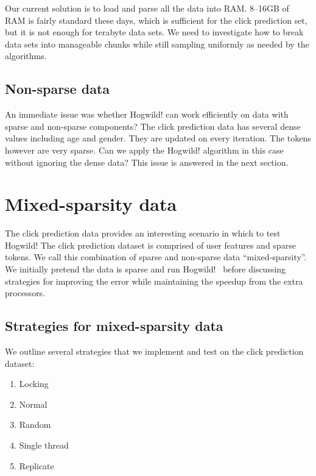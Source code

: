 \documentclass{article} %
\begin{document}
Our current solution is to load and parse all the data into RAM. 8--16GB of RAM is fairly standard these days, which is sufficient for the click prediction set, but it is not enough for terabyte data sets. We need to investigate how to break data sets into manageable chunks while still sampling uniformly as needed by the algorithms. 

\subsection{Non-sparse data}
An immediate issue was whether Hogwild! can work efficiently on data with sparse and non-sparse components? The click prediction data has several dense values including age and gender. They are updated on every iteration. The tokens however are very sparse. Can we apply the Hogwild! algorithm in this case without ignoring the dense data? This issue is answered in the next section.

\section{Mixed-sparsity data}
The click prediction data provides an interesting scenario in which to test Hogwild! The click prediction dataset is comprised of user features and sparse tokens. We call this combination of sparse and non-sparse data ``mixed-sparsity''. We initially pretend the data is sparse and run Hogwild!~ before discussing strategies for improving the error while maintaining the speedup from the extra processors.

\subsection{Strategies for mixed-sparsity data}
We outline several strategies that we implement and test on the click prediction dataset:
\begin{enumerate}
\item Locking
\item Normal
\item Random
\item Single thread
\item Replicate
\end{enumerate}
\end{document}
